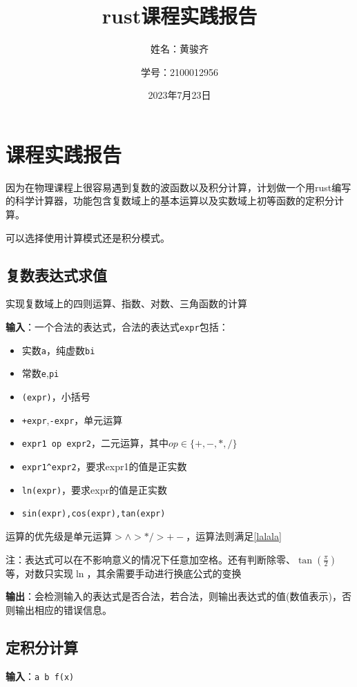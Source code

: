 \documentclass[UTF8,11pt]{ctexart}
\title{rust课程实践报告}
\author{姓名：黄骏齐\and 学号：2100012956}
\date{2023年7月23日}
\begin{document}
    \maketitle
    \section*{课程实践报告}
        因为在物理课程上很容易遇到复数的波函数以及积分计算，计划做一个用rust编写的科学计算器，功能包含复数域上的基本运算以及实数域上初等函数的定积分计算。
        
        可以选择使用计算模式还是积分模式。

        \subsection*{复数表达式求值}
            \noindent 实现复数域上的四则运算、指数、对数、三角函数的计算

            \noindent \textbf{输入}：一个合法的表达式，合法的表达式\lstinline|expr|包括：
            \begin{itemize}
                \item 实数\lstinline|a|，纯虚数\lstinline|bi|
                \item 常数\lstinline|e|,\lstinline|pi|
                \item \lstinline|(expr)|，小括号
                \item \lstinline|+expr|,\lstinline|-expr|，单元运算
                \item \lstinline|expr1 op expr2|，二元运算，其中$op \in \{+,-,*,/\}$
                \item \lstinline|expr1^expr2|，要求expr1的值是正实数
                \item \lstinline|ln(expr)|，要求expr的值是正实数
                \item \lstinline|sin(expr),cos(expr),tan(expr)|
            \end{itemize}
            
            运算的优先级是单元运算$>\wedge >*/>+-$，运算法则满足\ref{lalala}

            \noindent 注：表达式可以在不影响意义的情况下任意加空格。还有判断除零、$\tan(\frac{\pi}{2})$等，对数只实现$\ln$，其余需要手动进行换底公式的变换

            \noindent \textbf{输出}：会检测输入的表达式是否合法，若合法，则输出表达式的值(数值表示)，否则输出相应的错误信息。
        \subsection*{定积分计算}    
            \noindent \textbf{输入}：\lstinline|a b f(x)|
\end{document}
